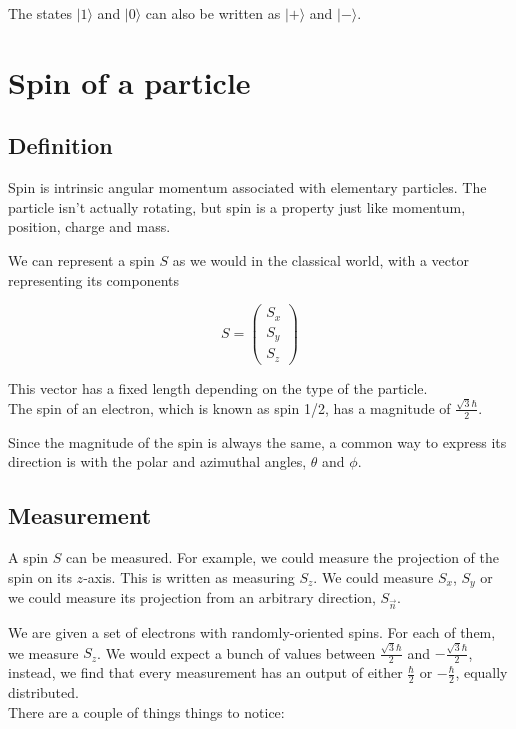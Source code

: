 \documentclass[a4paper]{article}
\begin{document}
The states \(|1\rangle\) and \(|0\rangle\) can also be written as \(|+\rangle\) and \(|-\rangle\).

\pagebreak

\section{Spin of a particle}

\subsection{Definition}

Spin is intrinsic angular momentum associated with elementary particles.
The particle isn't actually rotating, but spin is a property just like momentum, position, charge and mass.

We can represent a spin \(S\) as we would in the classical world, with a vector representing its components

\[
    S=
    \begin{pmatrix}
        S_x \\
        S_y \\
        S_z
    \end{pmatrix}
\]

This vector has a fixed length depending on the type of the particle. \\
The spin of an electron, which is known as spin 1/2, has a magnitude of \(\frac{\sqrt{3}\hbar}{2}\).

Since the magnitude of the spin is always the same, a common way to express its direction is with the polar and azimuthal angles, \(\theta\) and \(\phi\).

\subsection{Measurement}

A spin \(S\) can be measured. For example, we could measure the projection of the spin on its \(z\)-axis.
This is written as measuring \(S_z\). We could measure \(S_x\), \(S_y\) or we could measure its projection from an arbitrary direction, \(S_{\vec{n}}\).

We are given a set of electrons with randomly-oriented spins. For each of them, we measure \(S_z\).
We would expect a bunch of values between \(\frac{\sqrt{3}\hbar}{2}\) and \(-\frac{\sqrt{3}\hbar}{2}\),
instead, we find that every measurement has an output of either \(\frac{\hbar}{2}\) or \(-\frac{\hbar}{2}\), equally distributed. \\
There are a couple of things things to notice:
\end{document}
